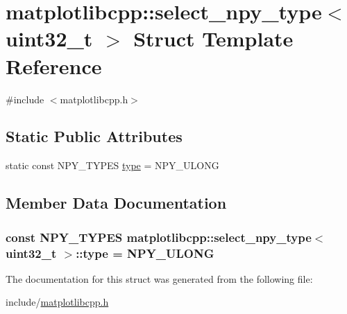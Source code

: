 \hypertarget{structmatplotlibcpp_1_1select__npy__type_3_01uint32__t_01_4}{}\section{matplotlibcpp\+:\+:select\+\_\+npy\+\_\+type$<$ uint32\+\_\+t $>$ Struct Template Reference}
\label{structmatplotlibcpp_1_1select__npy__type_3_01uint32__t_01_4}


{\ttfamily \#include $<$matplotlibcpp.\+h$>$}

\subsection*{Static Public Attributes}
\begin{DoxyCompactItemize}
\item 
static const N\+P\+Y\+\_\+\+T\+Y\+P\+ES \hyperlink{structmatplotlibcpp_1_1select__npy__type_3_01uint32__t_01_4_a21b0fbd17b661ef512cc1c3c728dfa60}{type} = N\+P\+Y\+\_\+\+U\+L\+O\+NG
\end{DoxyCompactItemize}


\subsection{Member Data Documentation}
\subsubsection[{\texorpdfstring{type}{type}}]{\setlength{\rightskip}{0pt plus 5cm}const N\+P\+Y\+\_\+\+T\+Y\+P\+ES {\bf matplotlibcpp\+::select\+\_\+npy\+\_\+type}$<$ uint32\+\_\+t $>$\+::type = N\+P\+Y\+\_\+\+U\+L\+O\+NG\hspace{0.3cm}{\ttfamily [static]}}\hypertarget{structmatplotlibcpp_1_1select__npy__type_3_01uint32__t_01_4_a21b0fbd17b661ef512cc1c3c728dfa60}{}\label{structmatplotlibcpp_1_1select__npy__type_3_01uint32__t_01_4_a21b0fbd17b661ef512cc1c3c728dfa60}


The documentation for this struct was generated from the following file\+:\begin{DoxyCompactItemize}
\item 
include/\hyperlink{matplotlibcpp_8h}{matplotlibcpp.\+h}\end{DoxyCompactItemize}
